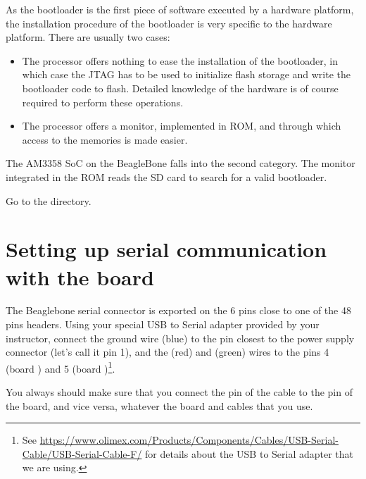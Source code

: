 
As the bootloader is the first piece of software executed by a
hardware platform, the installation procedure of the bootloader is
very specific to the hardware platform. There are usually two cases:

\begin{itemize}

\item The processor offers nothing to ease the installation of the
  bootloader, in which case the JTAG has to be used to initialize
  flash storage and write the bootloader code to flash. Detailed
  knowledge of the hardware is of course required to perform these
  operations.

\item The processor offers a monitor, implemented in ROM, and through
  which access to the memories is made easier.

\end{itemize}

The AM3358 SoC on the BeagleBone falls into the second category. The monitor
integrated in the ROM reads the SD card to search for a valid
bootloader.

Go to the  directory.

\section{Setting up serial communication with the board}

The Beaglebone serial connector is exported on the 6 pins close to one
of the 48 pins headers. Using your special USB to Serial adapter provided
by your instructor, connect the ground wire (blue) to the pin closest
to the power supply connector (let's call it pin 1), and the  (red)
and  (green) wires to the pins 4 (board ) and
5 (board )\footnote{See
\url{https://www.olimex.com/Products/Components/Cables/USB-Serial-Cable/USB-Serial-Cable-F/}
for details about the USB to Serial adapter that we are using.}.

You always should make sure that you connect the  pin of the cable
to the  pin of the board, and vice versa, whatever the board and
cables that you use.

